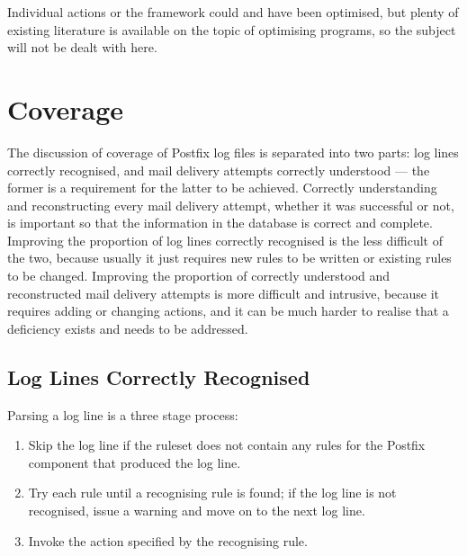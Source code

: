 Individual actions or the framework could and have been optimised, but
plenty of existing literature is available on the topic of optimising
programs, so the subject will not be dealt with here.



\FloatBarrier{}

\section{Coverage}

\label{parsing coverage}

The discussion of \parsernames{} coverage of Postfix log files is separated
into two parts: log lines correctly recognised, and mail delivery attempts
correctly understood --- the former is a requirement for the latter to be
achieved.  Correctly understanding and reconstructing every mail delivery
attempt, whether it was successful or not, is important so that the
information in the database is correct and complete.  Improving the
proportion of log lines correctly recognised is the less difficult of the
two, because usually it just requires new rules to be written or existing
rules to be changed.  Improving the proportion of correctly understood and
reconstructed mail delivery attempts is more difficult and intrusive,
because it requires adding or changing actions, and it can be much harder
to realise that a deficiency exists and needs to be addressed.

\subsection{Log Lines Correctly Recognised}

\label{log-lines-covered}

Parsing a log line is a three stage process:

\begin{enumerate}

    \squeezeitems{}

    \item Skip the log line if the ruleset does not contain any rules for
        the Postfix component that produced the log line.

    \item Try each rule until a recognising rule is found; if the log line
        is not recognised, issue a warning and move on to the next log
        line.

    \item Invoke the action specified by the recognising rule.

\end{enumerate}


